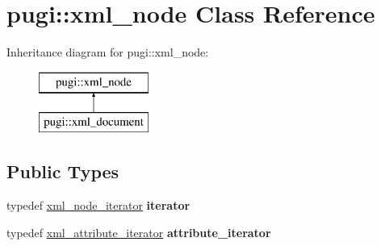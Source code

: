 \hypertarget{classpugi_1_1xml__node}{\section{pugi\-:\-:xml\-\_\-node Class Reference}
\label{classpugi_1_1xml__node}
}
Inheritance diagram for pugi\-:\-:xml\-\_\-node\-:\begin{figure}[H]
\begin{center}
\leavevmode
\includegraphics[height=2.000000cm]{classpugi_1_1xml__node}
\end{center}
\end{figure}
\subsection*{Public Types}
\begin{DoxyCompactItemize}
\item 
\hypertarget{classpugi_1_1xml__node_ae053ea39add5a64de584f7a81212e388}{typedef \hyperlink{classpugi_1_1xml__node__iterator}{xml\-\_\-node\-\_\-iterator} {\bfseries iterator}}\label{classpugi_1_1xml__node_ae053ea39add5a64de584f7a81212e388}

\item 
\hypertarget{classpugi_1_1xml__node_a9084f97350ffc64af1eaf7c17c57f4ba}{typedef \hyperlink{classpugi_1_1xml__attribute__iterator}{xml\-\_\-attribute\-\_\-iterator} {\bfseries attribute\-\_\-iterator}}\label{classpugi_1_1xml__node_a9084f97350ffc64af1eaf7c17c57f4ba}

\end{DoxyCompactItemize}
